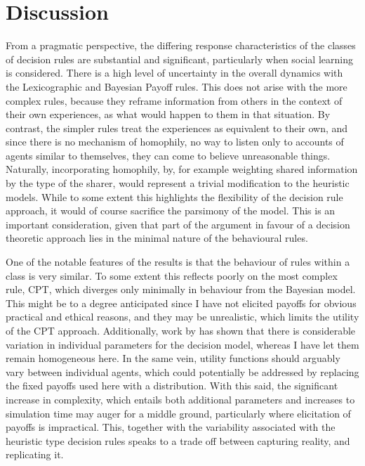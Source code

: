 \section{Discussion}
\label{sec:discussion}
%

From a pragmatic perspective, the differing response characteristics of the classes of decision rules are substantial and significant, particularly when social learning is considered. There is a high level of uncertainty in the overall dynamics with the Lexicographic and Bayesian Payoff rules. This does not arise with the more complex rules, because they reframe information from others in the context of their own experiences, as what would happen to them in that situation. By contrast, the simpler rules treat the experiences as equivalent to their own, and since there is no mechanism of homophily, no way to listen only to accounts of agents similar to themselves, they can come to believe unreasonable things. Naturally, incorporating homophily, by, for example weighting shared information by the type of the sharer, would represent a trivial modification to the heuristic models. While to some extent this highlights the flexibility of the decision rule approach, it would of course sacrifice the parsimony of the model. This is an important consideration, given that part of the argument in favour of a decision theoretic approach lies in the minimal nature of the behavioural rules.

One of the notable features of the results is that the behaviour of rules within a class is very similar. To some extent this reflects poorly on the most complex rule, \ac{CPT}, which diverges only minimally in behaviour from the Bayesian model. This might be to a degree anticipated since I have not elicited payoffs for obvious practical and ethical reasons, and they may be unrealistic, which limits the utility of the \ac{CPT} approach.  Additionally, work by \citet{Glockner2012} has shown that there is considerable variation in individual parameters for the decision model, whereas I have let them remain homogeneous here. In the same vein, utility functions should arguably vary between individual agents, which could potentially be addressed by replacing the fixed payoffs used here with a distribution.  With this said, the significant increase in complexity, which entails both additional parameters and increases to simulation time may auger for a middle ground, particularly where elicitation of payoffs is impractical.  This, together with the variability associated with the heuristic type decision rules speaks to a trade off between capturing reality, and replicating it.

